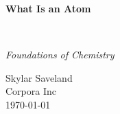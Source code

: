
\clearpage
\vspace*{1.5in}
\begin{center}
  \begin{minipage}{\textwidth}
    \centering
    \Huge\bfseries
    \linespread{1.25}\selectfont
  What Is an Atom
  \end{minipage}
  \\[3em]
  {\Large\itshape\linespread{1.3}\selectfont
  Foundations of Chemistry\par}
  \vfill
  {\large Skylar Saveland}
  \\[1em]
  {\large Corpora Inc}
  \\[1em]
  {\large \today}
\end{center}
\clearpage
